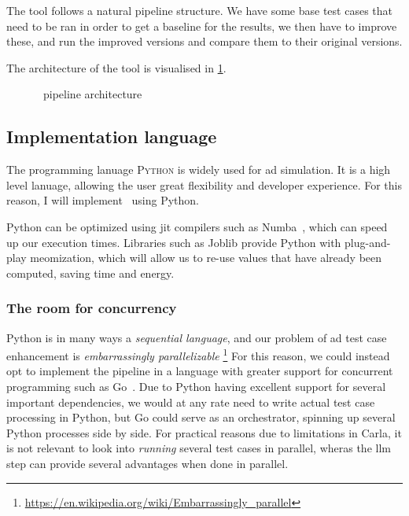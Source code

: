 The tool follows a natural pipeline structure. We have some base test cases that
need to be ran in order to get a baseline for the results, we then have to
improve these, and run the improved versions and compare them to their original
versions.

The architecture of the tool is visualised in \cref{fig:hefeArch}.

\begin{figure}[h]
    \centering
    
    \caption{\hefe~pipeline architecture}\label{fig:hefeArch}
\end{figure}

\subsection{Implementation language}

The programming lanuage \textsc{Python} is widely used for \acrfull{ad} simulation. It is a high
level lanuage, allowing the user great flexibility and developer experience. For this reason, I will
implement \hefe~using Python.

Python can be optimized using \acrfull{jit} compilers such as Numba~\cite{numba}, which can speed up
our execution times. Libraries such as Joblib provide Python with plug-and-play
meomization, which will allow us to re-use values that have already been
computed, saving time and energy.

\subsubsection{The room for concurrency}

Python is in many ways a \textit{sequential language},  and our problem of
\acrshort{ad} test case enhancement is \textit{embarrassingly parallelizable}
\footnote{\url{https://en.wikipedia.org/wiki/Embarrassingly_parallel}}
For this reason, we could instead  opt to implement the pipeline in a language
with greater support for concurrent  programming such as  Go~\cite[102]{go}.
Due to Python having excellent support for several important
dependencies, we would at any rate need to write actual test case processing in
Python, but Go could serve as an orchestrator, spinning up several Python
processes side by side.
For practical reasons due to limitations in Carla, it is not relevant to look
into \textit{running} several test cases in parallel, wheras the \acrshort{llm}
step can provide several advantages when done in parallel.

